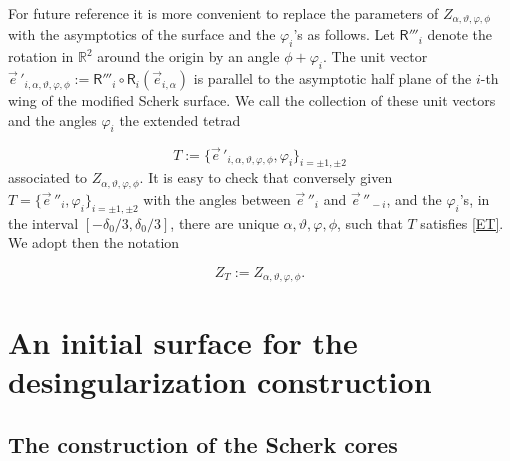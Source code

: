 \documentclass[12pt,namelimits,sumlimits]{amsart}
\theoremstyle{remark}
\numberwithin{equation}{section}
\begin{document}
For future reference it is more convenient to replace the parameters of $Z_{{\alpha,\vartheta,\varphi,\phi}}$ with the asymptotics
of the surface and the $\varphi_i$'s as follows.
Let ${\mathsf{R}}'''_i$ denote the rotation in ${{{\mathbb{R}}^2}}$ around the origin by an angle $\phi+\varphi_i$.
The unit vector ${\vec{e}^{\,} {}'_{\!{{i,\alpha,\vartheta,\varphi,\phi}}}}:={\mathsf{R}}'''_i\circ{\mathsf{R}}_i({\vec{e}}_{{i,\alpha}})$
is parallel to the asymptotic half plane of the $i$-th wing of the modified
Scherk surface.
We call the collection of these unit
vectors and the angles $\varphi_i$ the extended tetrad
\addtocounter{theorem}{1}
\begin{equation}
\label{ET}
T:=\{{\vec{e}^{\,} {}'_{\!{{i,\alpha,\vartheta,\varphi,\phi}}}},\varphi_i\}_{i=\pm1,\pm2}
\end{equation}
associated to $Z_{{\alpha,\vartheta,\varphi,\phi}}$.
It is easy to check that conversely given
$
T=\{{\vec{e}^{\,} {}''_{\!i}},\varphi_i\}_{i=\pm1,\pm2}
$
with the angles between ${\vec{e}^{\,} {}''_{\!i}}$ and ${\vec{e}^{\,} {}''_{\!-i}}$, and the $\varphi_i$'s,
in the interval $[-\delta_0/3,\delta_0/3]$,
there are unique ${{\alpha,\vartheta,\varphi,\phi}}$,
such that $T$ satisfies \ref{ET}.
We adopt then the notation
\addtocounter{theorem}{1}
\begin{equation}
\label{EZT}
Z_T:=Z_{{\alpha,\vartheta,\varphi,\phi}}.
\end{equation}

\section{An initial surface for the desingularization construction}
\label{Scentral}
\nopagebreak

\subsection*{The construction of the Scherk cores}
$\phantom{ab}$
\nopagebreak
\end{document}
